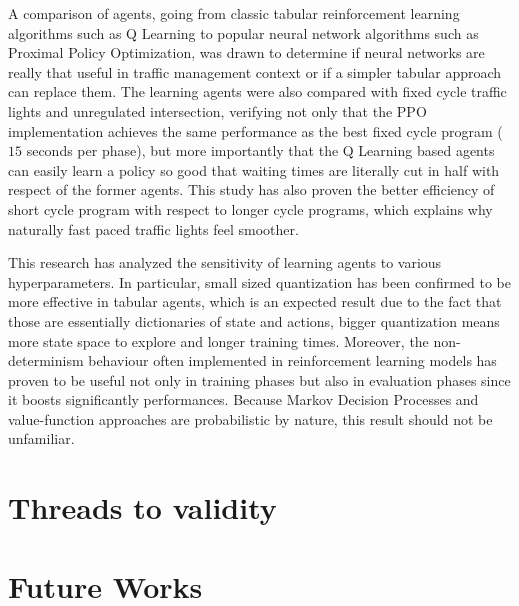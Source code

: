 A comparison of agents, going from classic tabular reinforcement learning algorithms such as Q Learning to popular neural network algorithms such as Proximal Policy Optimization, was drawn to determine if neural networks are really that useful in traffic management context or if a simpler tabular approach can replace them.
The learning agents were also compared with fixed cycle traffic lights and unregulated intersection, verifying not only that the PPO implementation achieves the same performance as the best fixed cycle program ($15$ seconds per phase), but more importantly that the Q Learning based agents can easily learn a policy so good that waiting times are literally cut in half with respect of the former agents.
This study has also proven the better efficiency of short cycle program with respect to longer cycle programs, which explains why naturally fast paced traffic lights feel smoother.

This research has analyzed the sensitivity of learning agents to various hyperparameters.
In particular, small sized quantization has been confirmed to be more effective in tabular agents, which is an expected result due to the fact that those are essentially dictionaries of state and actions, bigger quantization means more state space to explore and longer training times.
Moreover, the non-determinism behaviour often implemented in reinforcement learning models has proven to be useful not only in training phases but also in evaluation phases since it boosts significantly performances.
Because Markov Decision Processes and value-function approaches are probabilistic by nature, this result should not be unfamiliar.


\section{Threads to validity}

\section{Future Works}
